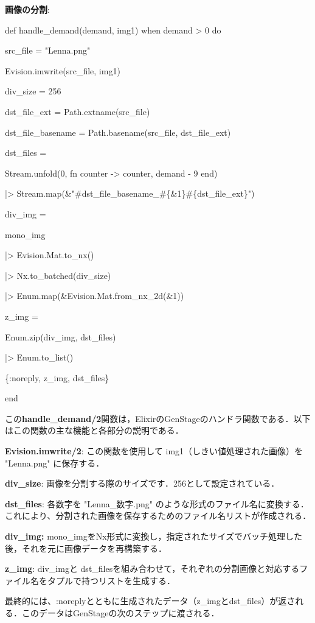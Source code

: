 \documentclass[a4paper]{jreport}	%
\begin{document}
\textbf{画像の分割}:

def handle\_demand(demand, img1) when demand > 0 do   

    src\_file = "Lenna.png"
    
    Evision.imwrite(src\_file, img1)
    
    div\_size = 256
    
    dst\_file\_ext = Path.extname(src\_file)
    
    dst\_file\_basename = Path.basename(src\_file, dst\_file\_ext)
    
    dst\_files =
    
      Stream.unfold(0, fn counter -> {counter, demand - 9} end)
      
      |> Stream.map(\&"\#{dst\_file\_basename}\_\#\{\&1\}\#\{dst\_file\_ext\}")
    
    div\_img =
    
    mono\_img
    
    |> Evision.Mat.to\_nx()
    
    |> Nx.to\_batched(div\_size)
    
    |> Enum.map(\&Evision.Mat.from\_nx\_2d(\&1))
    
    z\_img = 
    
    Enum.zip(div\_img, dst\_files)
    
    |> Enum.to\_list()
    
    \{:noreply, z\_img, dst\_files\}
  
end

この\textbf{handle\_demand/2}関数は，ElixirのGenStageのハンドラ関数である．以下はこの関数の主な機能と各部分の説明である．

\textbf{Evision.imwrite/2}: この関数を使用して img1（しきい値処理された画像）を "Lenna.png" に保存する．

\textbf{div\_size}: 画像を分割する際のサイズです．256として設定されている．

\textbf{dst\_files}: 各数字を "Lenna\_数字.png" のような形式のファイル名に変換する．これにより、分割された画像を保存するためのファイル名リストが作成される．

\textbf{div\_img:} mono\_imgをNx形式に変換し，指定されたサイズでバッチ処理した後，それを元に画像データを再構築する．

\textbf{z\_img}: div\_imgと dst\_filesを組み合わせて，それぞれの分割画像と対応するファイル名をタプルで持つリストを生成する．

最終的には、:noreplyとともに生成されたデータ（z\_imgとdst\_files）が返される．このデータはGenStageの次のステップに渡される．
\end{document}
